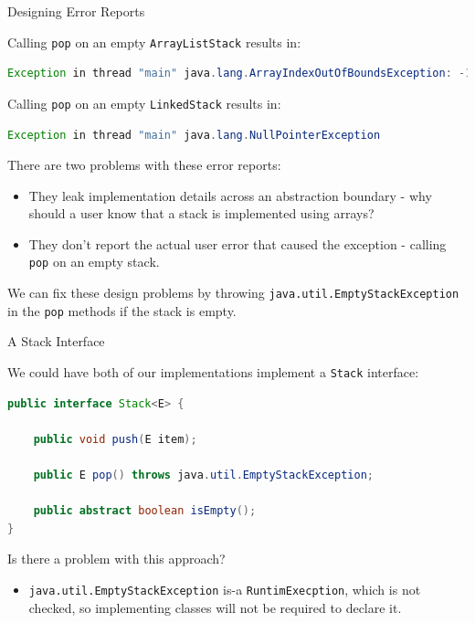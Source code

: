\documentclass{beamer}
\begin{document}
\begin{frame}[fragile]{Designing Error Reports}


Calling {\tt pop} on an empty {\tt ArrayListStack} results in:
\begin{lstlisting}[language=Java]
Exception in thread "main" java.lang.ArrayIndexOutOfBoundsException: -1
\end{lstlisting}

Calling {\tt pop} on an empty {\tt LinkedStack} results in:
\begin{lstlisting}[language=Java]
Exception in thread "main" java.lang.NullPointerException
\end{lstlisting}
There are two problems with these error reports:
\begin{itemize}
\item They leak implementation details across an abstraction boundary - why should a user know that a stack is implemented using arrays?
\item They don't report the actual user error that caused the exception - calling {\tt pop} on an empty stack.
\end{itemize}

We can fix these design problems by throwing {\tt java.util.EmptyStackException} in the {\tt pop} methods if the stack is empty.

\end{frame}

\begin{frame}[fragile]{A Stack Interface}

We could have both of our implementations implement a {\tt Stack} interface:
\begin{lstlisting}[language=Java]
public interface Stack<E> {

    public void push(E item);

    public E pop() throws java.util.EmptyStackException;

    public abstract boolean isEmpty();
}
\end{lstlisting}
Is there a problem with this approach?
\begin{itemize}
\item<2> {\tt java.util.EmptyStackException} is-a {\tt RuntimExecption}, which is not checked, so implementing classes will not be required to declare it.
\end{itemize}


\end{frame}
\end{document}
